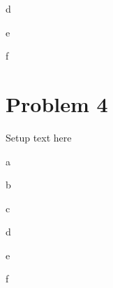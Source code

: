 \documentclass{article}
\begin{document}
\begin{problem}{d}
\end{problem}
\begin{solution}
\end{solution}

\begin{problem}{e}
\end{problem}
\begin{solution}
\end{solution}

\begin{problem}{f}
\end{problem}
\begin{solution}
\end{solution}

\newpage
\section*{Problem 4}
Setup text here

\begin{problem}{a}
\end{problem}
\begin{solution}
\end{solution}

\begin{problem}{b}
\end{problem}
\begin{solution}
\end{solution}

\begin{problem}{c}
\end{problem}
\begin{solution}
\end{solution}

\begin{problem}{d}
\end{problem}
\begin{solution}
\end{solution}

\begin{problem}{e}
\end{problem}
\begin{solution}
\end{solution}

\begin{problem}{f}
\end{problem}
\begin{solution}
\end{solution}
\end{document}
